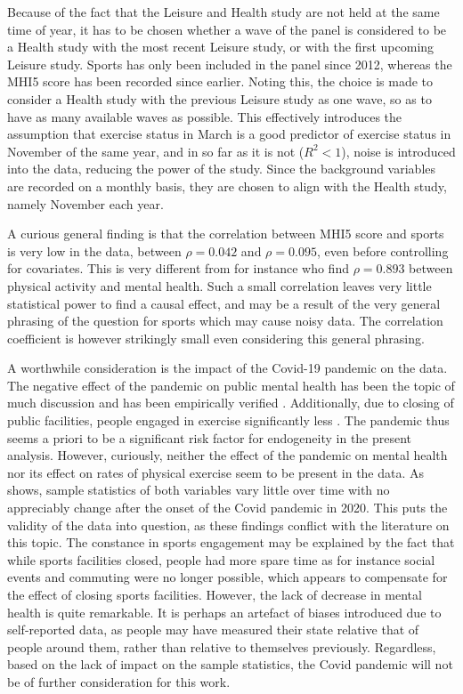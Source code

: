 Because of the fact that the Leisure and Health study are not held at the same time of year, it has to be chosen whether
a wave of the panel is considered to be a Health study with the most recent Leisure study, or with the first upcoming
Leisure study.
Sports has only been included in the panel since 2012, whereas the MHI5 score has been recorded since earlier.
Noting this, the choice is made to consider a Health study with the previous Leisure study as one wave,
so as to have as many available waves as possible.
This effectively introduces the assumption that exercise status in March is a good predictor of exercise status
in November of the same year, and in so far as it is not ($R^2 < 1$),
noise is introduced into the data, reducing the power of the study.
Since the background variables are recorded on a monthly basis, they are chosen to align with the Health study,
namely November each year.

A curious general finding is that the correlation between MHI5 score and sports is very low in the data,
between $\rho = 0.042$ and $\rho = 0.095$, even before controlling for covariates.
This is very different from for instance  who find $\rho = 0.893$ between
physical activity and mental health.
Such a small correlation leaves very little statistical power to find a causal effect, and may be a result of
the very general phrasing of the question for sports which may cause noisy data.
The correlation coefficient is however strikingly small even considering this general phrasing.

A worthwhile consideration is the impact of the Covid-19 pandemic on the data. The negative effect of the pandemic on public
mental health has been the topic of much discussion \cite{cullen2020mental,kumar2021covid} and has been empirically verified \cite{kupcova2023effects}.
Additionally, due to closing of public facilities, people engaged in exercise significantly less \cite{amini2021covid}.
The pandemic thus seems a priori to be a significant risk factor for endogeneity in the present analysis.
However, curiously, neither the effect of the pandemic on mental health nor its effect on rates of physical exercise
seem to be present in the data. As  shows, sample statistics of both variables
vary little over time with no appreciably change after the onset of the Covid pandemic in 2020.
This puts the validity of the data into question, as these findings conflict with the literature on this topic.
The constance in sports engagement may be explained by the fact that while sports facilities closed, people had more spare time
as for instance social events and commuting were no longer possible, which appears to compensate for the effect of
closing sports facilities.
However, the lack of decrease in mental health is quite remarkable. It is perhaps an artefact of biases introduced
due to self-reported data, as people may have measured their state relative that of people around them, rather than
relative to themselves previously.
Regardless, based on the lack of impact on the sample statistics, the Covid pandemic will not be of further consideration
for this work.

